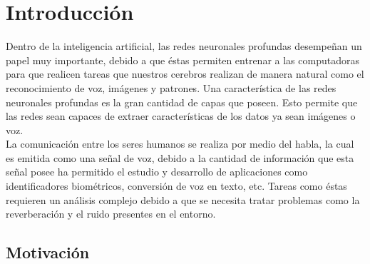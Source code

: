 \chapter{Introducción}
Dentro de la inteligencia artificial, las redes neuronales profundas desempeñan un papel muy importante, debido a que éstas permiten entrenar a las computadoras para que realicen tareas que nuestros cerebros realizan de manera natural como el reconocimiento de voz, imágenes y patrones. Una característica de las redes neuronales profundas es la gran cantidad de capas que poseen. Esto permite que las redes sean capaces de extraer características de los datos ya sean imágenes o voz.\\
 La comunicación entre los seres humanos se realiza por medio del habla, la cual es emitida como una señal de voz, debido a la cantidad de información que esta señal posee ha permitido el estudio y desarrollo de aplicaciones como identificadores biométricos, conversión de voz en texto, etc. Tareas como éstas requieren un análisis complejo debido a que se necesita tratar problemas como la reverberación y el ruido presentes en el entorno.




\section{Motivación}

